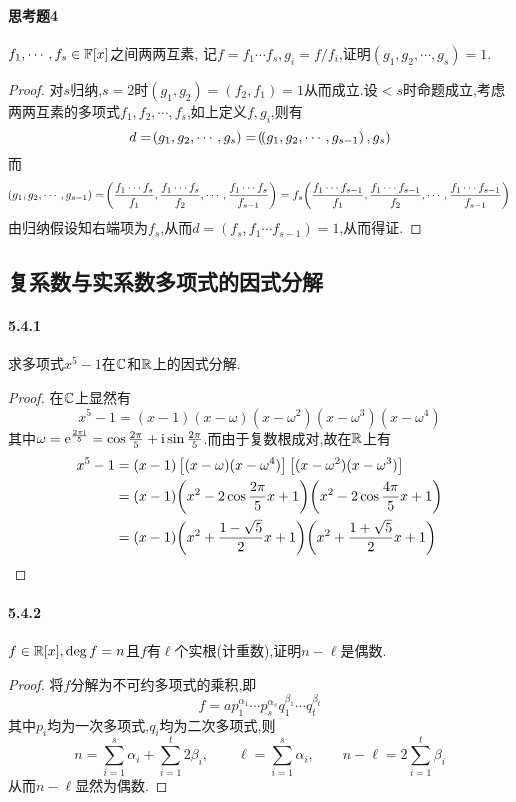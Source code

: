 \documentclass[11pt]{article}
\begin{document}
\paragraph{思考题4}$f_1,\cdots,f_s\in \mathbb{F}[x]$之间两两互素, 记$f=f_1\cdots f_s, g_i=f/f_i$,证明$(g_1,g_2,\cdots,g_s)=1$.
\begin{proof}
    对$s$归纳,$s=2$时$(g_1,g_2)=(f_2,f_1)=1$从而成立.设$<s$时命题成立,考虑两两互素的多项式$f_1,f_2,\cdots,f_s$,如上定义$f,g_i$,则有
    $$d=\!\left(g_1,g_2,\cdots,g_s\right)=\!\left(\!\left(g_1,g_2,\cdots,g_{s-1}\right),g_s\right)$$
    而
    $$\!\left(g_1,g_2,\cdots,g_{s-1}\right)=\!\left(\frac{f_1\cdots f_s}{f_1},\frac{f_1\cdots f_s}{f_2},\cdots,\frac{f_1\cdots f_s}{f_{s-1}}\right)=f_s\!\left(\frac{f_1\cdots f_{s-1}}{f_1},\frac{f_1\cdots f_{s-1}}{f_2},\cdots,\frac{f_1\cdots f_{s-1}}{f_{s-1}}\right)$$
    由归纳假设知右端项为$f_s$,从而$d=(f_s,f_1\cdots f_{s-1})=1$,从而得证.
\end{proof}

\newpage
\subsection{复系数与实系数多项式的因式分解}
\paragraph{5.4.1}求多项式$x^5-1$在$\mathbb{C}$和$\mathbb{R}$上的因式分解.
\begin{proof}
    在$\mathbb{C}$上显然有
    $$x^5-1=(x-1)(x-\omega)(x-\omega^2)(x-\omega^3)(x-\omega^4)$$
    其中$\omega=\mathrm{e}^{\frac{2\pi\mathrm{i}}{5}}=\cos\frac{2\pi}{5}+\mathrm{i} \sin\frac{2\pi}{5}$.而由于复数根成对,故在$\mathbb{R}$上有
    $$\begin{aligned}
        x^5-1&=(x-1)\left[(x-\omega)(x-\omega^4)\right]\left[(x-\omega^2)(x-\omega^3)\right]\\
        &=(x-1)\!\left(x^2-2\cos\frac{2\pi}{5}x+1\right)\!\left(x^2-2\cos\frac{4\pi}{5}x+1\right)\\
        &=(x-1)\!\left(x^2+\frac{1-\sqrt{5}}{2}x+1\right)\!\left(x^2+\frac{1+\sqrt{5}}{2}x+1\right)
    \end{aligned}$$
\end{proof}
\paragraph{5.4.2}$f\in \mathbb{R}[x], \deg f=n$且$f$有$\ell$个实根(计重数),证明$n-\ell$是偶数.
\begin{proof}
    将$f$分解为不可约多项式的乘积,即
    $$f=a p_1^{\alpha_1}\cdots p_s^{\alpha_s}q_1^{\beta_1}\cdots q_t^{\beta_t}$$
    其中$p_i$均为一次多项式,$q_i$均为二次多项式,则
    $$n=\sum_{i=1}^s \alpha_i + \sum_{i=1}^t 2\beta_i,\qquad \ell=\sum_{i=1}^s \alpha_i,\qquad n-\ell=2\sum_{i=1}^t \beta_i$$
    从而$n-\ell$显然为偶数.
\end{proof}
\end{document}
